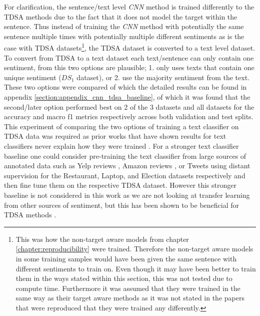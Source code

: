 For clarification, the sentence/text level \textit{CNN} method is trained differently to the TDSA methods due to the fact that it does not model the target within the sentence. Thus instead of training the \textit{CNN} method with potentially the same sentence multiple times with potentially multiple different sentiments as is the case with TDSA datasets\footnote{This was how the non-target aware models from chapter \ref{chapter:reproducibility} were trained. Therefore the non-target aware models in some training samples would have been given the same sentence with different sentiments to train on. Even though it may have been better to train them in the ways stated within this section, this was not tested due to compute time. Furthermore it was assumed that they were trained in the same way as their target aware methods as it was not stated in the papers \citep{vo2015target, tang-etal-2016-effective, wang-etal-2017-tdparse} that were reproduced that they were trained any differently.}, the TDSA dataset is converted to a text level dataset. To convert from TDSA to a text dataset each text/sentence can only contain one sentiment, from this two options are plausible; 1. only uses texts that contain one unique sentiment ($DS_1$ dataset), or 2. use the majority sentiment from the text. These two options were compared of which the detailed results can be found in appendix \ref{section:appendix_cnn_tdsa_baseline}, of which it was found that the second/later option performed best on 2 of the 3 datasets and all datasets for the accuracy and macro f1 metrics respectively across both validation and test splits. This experiment of comparing the two options of training a text classifier on TDSA data was required as prior works that have shown results for text classifiers never explain how they were trained \citep{tang-etal-2016-aspect,wang-etal-2016-attention,he-etal-2018-exploiting,jiang-etal-2019-challenge}. For a stronger text classifier baseline one could consider pre-training the text classifier from large sources of annotated data such as Yelp reviews \citep{tang-etal-2015-learning}, Amazon reviews \citep{mcauley2015image,he2016ups}, or Tweets using distant supervision \citep{go2009twitter} for the Restaurant, Laptop, and Election datasets respectively and then fine tune them on the respective TDSA dataset. However this stronger baseline is not considered in this work as we are not looking at transfer learning from other sources of sentiment, but this has been shown to be beneficial for TDSA methods \citep{he-etal-2018-exploiting}.  


